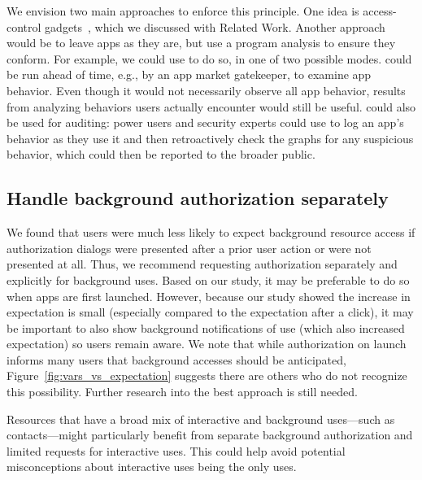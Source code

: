 We envision two main approaches to enforce this principle. One
idea is access-control gadgets~\cite{Roesner:2012,Roesner:2013}, which
we discussed with Related Work. 
Another approach would be to leave
apps as they are, but use a program analysis to ensure they
conform. For example, we could use \apptracer{} to do so, in one of two
possible modes. \apptracer{} could be run ahead of time, e.g., by an app 
market gatekeeper, to examine app behavior. Even though it would not necessarily observe all app behavior,
results from analyzing behaviors users actually encounter would still
be useful. \apptracer{} could also be used for auditing: power users and 
security experts could use
\apptracer{} to log an app's behavior as they use
it and then retroactively check the \apptracer{} graphs for any
suspicious behavior, which could then be reported to the broader public.

\subsection{Handle background authorization separately}

We found that users were much less likely to expect background
resource access if authorization dialogs were presented after a prior
user action or were not presented at all. Thus, we recommend requesting
authorization separately and explicitly for background uses. Based on
our study, it may be preferable to do so when apps are first
launched. However, because our study showed the increase in expectation is
small (especially compared to the expectation after a click), it
may be important to also show background notifications of use (which
also increased expectation) so users remain aware.
We note that while authorization on launch informs many 
users that background accesses should be anticipated, 
Figure~\ref{fig:vars_vs_expectation} suggests there are others who 
do not recognize this possibility. 
Further research into the best approach is still needed.

Resources that have a broad mix of interactive and background
uses---such as contacts---might particularly benefit from separate
background authorization and limited requests for interactive
uses. This could help avoid potential misconceptions about interactive
uses being the only uses.


